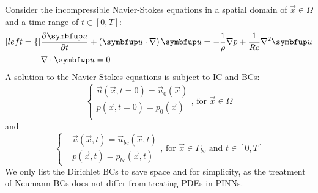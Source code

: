 Consider the incompressible Navier-Stokes equations in a spatial domain of $\vec{x}\in\Omega$ and a time range of $t\in[0, T]$:
\begin{subequations}\label{eq:orig-ns}
    \begin{align}[left=\empheqlbrace\,]
        &\pdiff{\vec{u}}{t} + \left(\vec{u} \cdot \nabla\right) \vec{u}
            =
            -\frac{1}{\rho}\nabla p + \frac{1}{Re} \nabla^2 \vec{u}
            \label{eq:orig-ns-momentum} \\
        &\nabla \cdot \vec{u} = 0 \label{eq:orig-ns-cont}
    \end{align}
\end{subequations}
A solution to the Navier-Stokes equations is subject to IC and BCs:
\begin{equation}\label{eq:orig-ns-ic}
    \left\{
        \begin{array}{l}
            \vec{u}(\vec{x}, t=0) = \vec{u}_0(\vec{x}) \\
            p(\vec{x}, t=0) = p_0(\vec{x}) \\
        \end{array}
    \right.
    \text{,\ \ for }
    \vec{x} \in \Omega
\end{equation}
and
\begin{equation}\label{eq:orig-ns-bc}
    \left\{
        \begin{aligned}
            &\vec{u}(\vec{x}, t) = \vec{u}_{bc}(\vec{x}, t) \\
            &p(\vec{x}, t) = p_{bc}(\vec{x}, t)
        \end{aligned}
        \text{,\ \ for }
        \vec{x} \in \Gamma_{bc}
        \text{ and }
        t \in [0, T]
    \right.
\end{equation}
We only list the Dirichlet BCs to save space and for simplicity, as the treatment of Neumann BCs does not differ from treating PDEs in PINNs.

